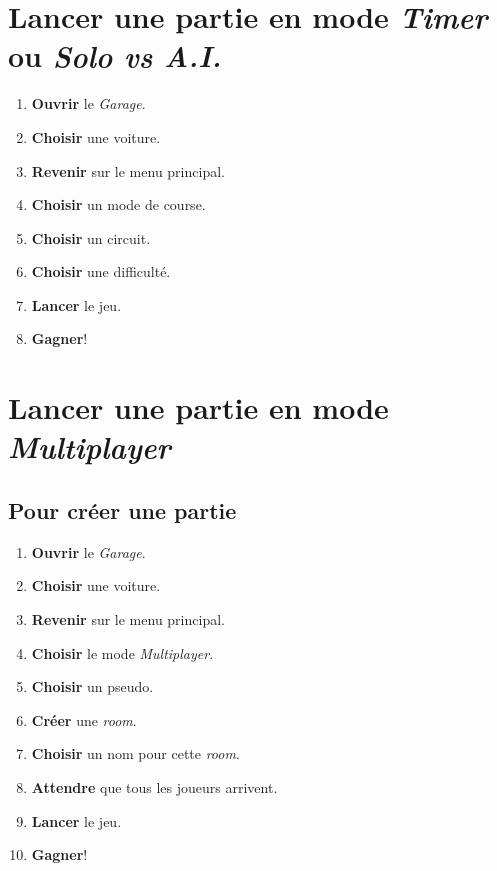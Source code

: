 \documentclass[a4paper,12pt]{article}
\newcommand\room{\textsl{room}}
\begin{document}
    \clearpage
    \section{Lancer une partie en mode \textsl{Timer} ou \textsl{Solo vs A.I.}}
        \begin{enumerate}
            \item \textbf{Ouvrir} le \textsl{Garage}.
            \item \textbf{Choisir} une voiture.
            \item \textbf{Revenir} sur le menu principal.
            \item \textbf{Choisir} un mode de course.
            \item \textbf{Choisir} un circuit.
            \item \textbf{Choisir} une difficulté.
            \item \textbf{Lancer} le jeu.
            \item \textbf{Gagner}!
        \end{enumerate}

    \clearpage
    \section{Lancer une partie en mode \textsl{Multiplayer}}
        \subsection{Pour créer une partie}
            \begin{enumerate}
                \item \textbf{Ouvrir} le \textsl{Garage}.
                \item \textbf{Choisir} une voiture.
                \item \textbf{Revenir} sur le menu principal.
                \item \textbf{Choisir} le mode \textsl{Multiplayer}.
                \item \textbf{Choisir} un pseudo.
                \item \textbf{Créer} une \room.
                \item \textbf{Choisir} un nom pour cette \room.
                \item \textbf{Attendre} que tous les joueurs arrivent.
                \item \textbf{Lancer} le jeu.
                \item \textbf{Gagner}!
            \end{enumerate}
\end{document}
